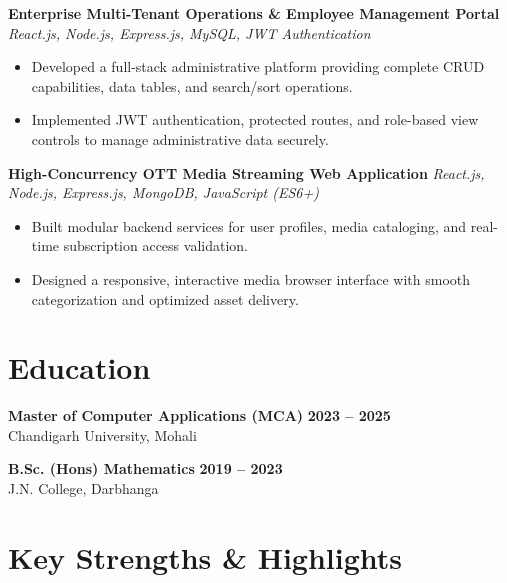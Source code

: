 \documentclass[a4paper,10pt]{article}
\begin{document}
\textbf{Enterprise Multi-Tenant Operations \& Employee Management Portal}
\hfill
\textit{React.js, Node.js, Express.js, MySQL, JWT Authentication}

\begin{itemize}

    \item Developed a full-stack administrative platform providing complete CRUD capabilities, data tables, and search/sort operations.

    \item Implemented JWT authentication, protected routes, and role-based view controls to manage administrative data securely.

\end{itemize}


\textbf{High-Concurrency OTT Media Streaming Web Application}
\hfill
\textit{React.js, Node.js, Express.js, MongoDB, JavaScript (ES6+)}

\begin{itemize}

    \item Built modular backend services for user profiles, media cataloging, and real-time subscription access validation.

    \item Designed a responsive, interactive media browser interface with smooth categorization and optimized asset delivery.

\end{itemize}

\section*{Education}

\textbf{Master of Computer Applications (MCA)}
\hfill
\textbf{2023 -- 2025}
\\
Chandigarh University, Mohali

\vspace{3pt}

\textbf{B.Sc. (Hons) Mathematics}
\hfill
\textbf{2019 -- 2023}
\\
J.N. College, Darbhanga

\section*{Key Strengths \& Highlights}
\end{document}
